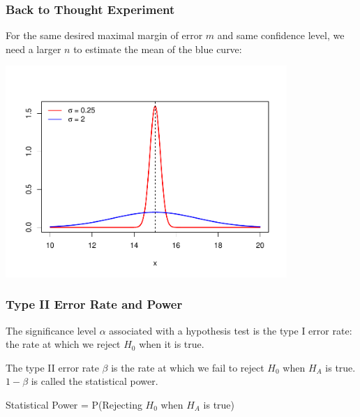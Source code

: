 \documentclass[handout]{beamer}
\newcommand{\blue}[1]{\textcolor{blue2}{#1}}
\begin{document}
\begin{frame}
\frametitle{Back to Thought Experiment}
For the same desired maximal margin of error $m$ and same confidence level, we need a larger $n$ to estimate the mean of the blue curve:
\begin{center}
\includegraphics[width=0.8\textwidth]{figure/norm.pdf}
\end{center}
\end{frame}



\begin{frame}
\frametitle{Type II Error Rate and Power}
The significance level $\alpha$ associated with a hypothesis test is the \blue{type I error rate}:  the rate at which we reject $H_0$ when it is true.  

\pause\vspace{0.5cm}

The \blue{type II error rate $\beta$} is the rate at which we fail to reject $H_0$ when $H_A$ is true.  $1-\beta$ is called the \blue{statistical power}.

\pause\vspace{0.5cm}

\blue{Statistical Power} = P(Rejecting $H_0$ when $H_A$ is true)

\end{frame}
\end{document}
